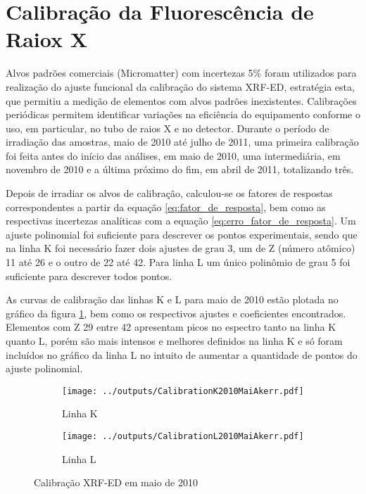 \section{Calibração da Fluorescência de Raiox X}

Alvos padrões comerciais (Micromatter) com incertezas 5\% foram utilizados para 
realização do ajuste funcional da calibração do sistema XRF-ED, estratégia esta, 
que permitiu a medição de elementos com alvos padrões inexistentes. Calibrações 
periódicas permitem identificar variações na eficiência do equipamento conforme 
o uso, em particular, no tubo de raios X e no detector. Durante o período de 
irradiação das amostras, maio de 2010 até julho de 2011, uma primeira calibração 
foi feita antes do início das análises, em maio de 2010, uma intermediária, 
em novembro de 2010 e a última próximo do fim, em abril de 2011, totalizando três. 

Depois de irradiar os alvos de calibração, calculou-se os fatores de respostas 
correspondentes a partir da equação \ref{eq:fator_de_resposta}, bem como as 
respectivas incertezas analíticas com a equação \ref{eq:erro_fator_de_resposta}.
Um ajuste polinomial foi suficiente para descrever os pontos experimentais,
sendo que na linha K foi necessário fazer dois ajustes de grau 3, um de Z 
(número atômico) 11 até 26 e o outro de 22 até 42. Para linha L um único 
polinômio de grau 5 foi suficiente para descrever todos pontos.

As curvas de calibração das linhas K e L para maio de 2010 estão plotada no 
gráfico da figura \ref{fig:edx_calib_KLmaio2010}, bem como os respectivos 
ajustes e coeficientes encontrados. Elementos com Z 29 entre 42 apresentam
picos no espectro tanto na linha K quanto L, porém são mais intensos e melhores
definidos na linha K e só foram incluídos no gráfico da linha L no intuito de 
aumentar a quantidade de pontos do ajuste polinomial.

\newpage
\begin{figure}[H]
  \begin{subfigure}[b]{0.5\textwidth}
    \texttt{[image: ../outputs/CalibrationK2010MaiAkerr.pdf]}
    \caption{Linha K}
  \end{subfigure}%
  \begin{subfigure}[b]{0.5\textwidth}
    \texttt{[image: ../outputs/CalibrationL2010MaiAkerr.pdf]}
    \caption{Linha L}
  \end{subfigure}
  \caption{Calibração XRF-ED em maio de 2010 \label{fig:edx_calib_KLmaio2010}}
\end{figure}

